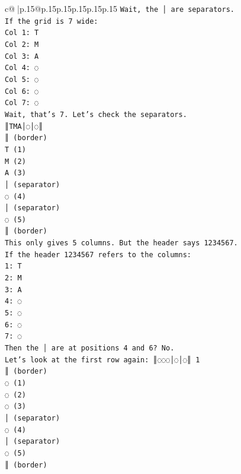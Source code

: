 \documentclass{article}
\begin{document}
{\begin{supertabular}{c@{$\;$}|p{.15\linewidth}@{}p{.15\linewidth}p{.15\linewidth}p{.15\linewidth}p{.15\linewidth}p{.15\linewidth}}
{{{\texttt{Wait, the │ are separators.} \\
\texttt{If the grid is 7 wide:} \\
\texttt{Col 1: T} \\
\texttt{Col 2: M} \\
\texttt{Col 3: A} \\
\texttt{Col 4: ◌} \\
\texttt{Col 5: ◌} \\
\texttt{Col 6: ◌} \\
\texttt{Col 7: ◌} \\
\texttt{Wait, that's 7. Let's check the separators.} \\
\texttt{║TMA│◌│◌║} \\
\texttt{║ (border)} \\
\texttt{T (1)} \\
\texttt{M (2)} \\
\texttt{A (3)} \\
\texttt{│ (separator)} \\
\texttt{◌ (4)} \\
\texttt{│ (separator)} \\
\texttt{◌ (5)} \\
\texttt{║ (border)} \\
\texttt{This only gives 5 columns. But the header says 1234567.} \\
\texttt{If the header 1234567 refers to the columns:} \\
\texttt{1: T} \\
\texttt{2: M} \\
\texttt{3: A} \\
\texttt{4: ◌} \\
\texttt{5: ◌} \\
\texttt{6: ◌} \\
\texttt{7: ◌} \\
\texttt{Then the │ are at positions 4 and 6? No.} \\
\texttt{Let's look at the first row again: ║◌◌◌│◌│◌║ 1} \\
\texttt{║ (border)} \\
\texttt{◌ (1)} \\
\texttt{◌ (2)} \\
\texttt{◌ (3)} \\
\texttt{│ (separator)} \\
\texttt{◌ (4)} \\
\texttt{│ (separator)} \\
\texttt{◌ (5)} \\
\texttt{║ (border)} \\
}}}
\end{supertabular}}
\end{document}
